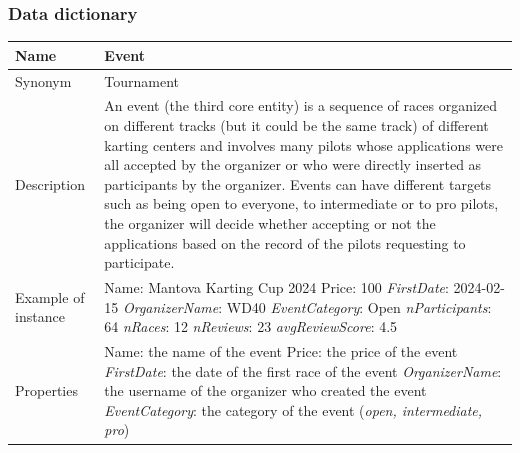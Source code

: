\documentclass{beamer}
\begin{document}
\begin{frame}
\frametitle{Data dictionary}
\begin{table}
\tiny
\begin{tabular}{|p{2cm}|p{6cm}|}
\hline
Name & \textbf{Event} \\
\hline
Synonym & Tournament \\
\hline
Description & An event (the third core entity) is a sequence of races organized on different
tracks (but it could be the same track) of different karting centers
and involves many pilots whose applications were all accepted by the organizer
or who were directly inserted as participants by the organizer.
Events can have different targets such as being open to everyone,
to intermediate or to pro pilots, the organizer will decide whether 
accepting or not the applications based on the record of the pilots
requesting to participate. \\
\hline
Example of instance &
Name: Mantova Karting Cup 2024 \newline
Price: 100 \newline
\textit{FirstDate}: 2024-02-15 \newline
\textit{OrganizerName}: WD40 \newline
\textit{EventCategory}: Open \newline
\textit{nParticipants}: 64 \newline
\textit{nRaces}: 12 \newline
\textit{nReviews}: 23 \newline
\textit{avgReviewScore}: 4.5 \\
\hline
Properties &
Name: the name of the event \newline
Price: the price of the event \newline
\textit{FirstDate}: the date of the first race of the event \newline
\textit{OrganizerName}: the username of the organizer who created the event \newline
\textit{EventCategory}: the category of the event (\textit{open, intermediate, pro}) \\
\hline
\end{tabular}
\end{table}
\end{frame}
\end{document}
